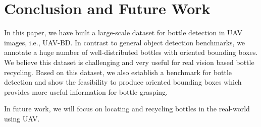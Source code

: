 \section{Conclusion and Future Work}
\label{sec:conclusion}


In this paper, we have built a large-scale dataset for bottle detection in UAV images, i.e., UAV-BD. In contrast to general object detection benchmarks, we annotate a huge number of well-distributed bottles with oriented bounding boxes. We believe this dataset is challenging and very useful for real vision based bottle recycling. Based on this dataset, we also establish a benchmark for bottle detection and show the feasibility to produce oriented bounding boxes which provides more useful information for bottle grasping.

In future work, we will focus on locating and recycling bottles in the real-world using UAV.